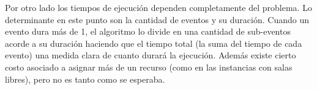 \documentclass[letter, 10pt]{article}
\begin{document}
Por otro lado los tiempos de ejecución dependen completamente del problema. Lo
determinante en este punto son la cantidad de eventos y su duración. Cuando un
evento dura más de 1, el algoritmo lo divide en una cantidad de sub-eventos
acorde a su duración haciendo que el tiempo total (la suma del tiempo de cada
evento) una medida clara de cuanto durará la ejecución. Además existe cierto
costo asociado a asignar más de un recurso (como en las instancias con salas
libres), pero no es tanto como se esperaba.



\end{document}
